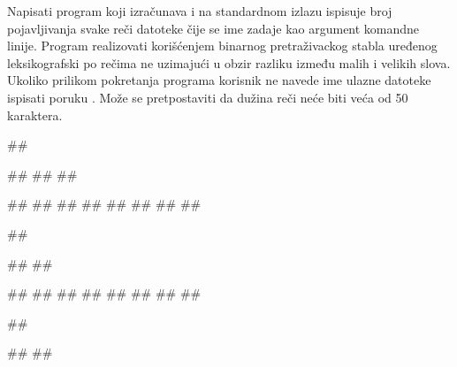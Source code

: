 \begin{Exercise}[label=702]
Napisati program koji izračunava i na standardnom izlazu ispisuje broj pojavljivanja svake reči datoteke čije se ime zadaje kao argument komandne linije. Program realizovati korišćenjem binarnog pretraživackog stabla uređenog leksikografski po rečima ne uzimajući u obzir razliku između malih i velikih slova. Ukoliko prilikom pokretanja programa korisnik ne navede ime ulazne datoteke ispisati poruku . Može se pretpostaviti da dužina reči neće biti veća od 50 karaktera.

\begin{miditest}
\begin{test}{1}
##
  
##
##
##

#\naslovIzlaz#
##
##
##
##
##
#\izlaz{}#
##
\end{test}
\end{miditest}
\begin{miditest}
\begin{test}{2}
##

##
##

#\naslovIzlaz#
##
##
##
##
#\izlaz{}#
##
##
\end{test}
\end{miditest}

\begin{miditest}
\begin{test}{3}
##
  
#\naslovIzlaz#
##
\end{test}
\end{miditest}


\end{Exercise}

\begin{Answer}[ref=702]
\end{Answer}


